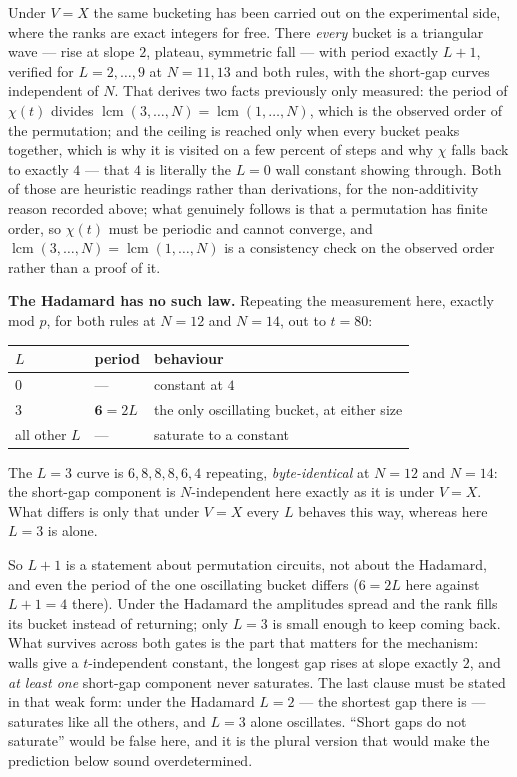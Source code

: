 \documentclass[11pt]{article}
\theoremstyle{plain}
\theoremstyle{remark}
\begin{document}
Under $V=X$ the same bucketing has been carried out on the experimental side,
where the ranks are exact integers for free. There \emph{every} bucket is a
triangular wave --- rise at slope $2$, plateau, symmetric fall --- with period
exactly $L+1$, verified for $L=2,\dots,9$ at $N=11,13$ and both rules, with the
short-gap curves independent of $N$. That derives two facts previously only
measured: the period of $\chi(t)$ divides
$\operatorname{lcm}(3,\dots,N)=\operatorname{lcm}(1,\dots,N)$, which is the
observed order of the permutation; and the ceiling is reached only when every
bucket peaks together, which is why it is visited on a few percent of steps and
why $\chi$ falls back to exactly $4$ --- that $4$ is literally the $L=0$ wall
constant showing through. Both of those are heuristic readings rather than
derivations, for the non-additivity reason recorded above; what genuinely follows
is that a permutation has finite order, so $\chi(t)$ must be periodic and cannot
converge, and $\operatorname{lcm}(3,\dots,N)=\operatorname{lcm}(1,\dots,N)$ is a
consistency check on the observed order rather than a proof of it.

\textbf{The Hadamard has no such law.} Repeating the measurement here, exactly
mod $p$, for both rules at $N=12$ and $N=14$, out to $t=80$:

\begin{center}
\begin{tabular}{lll}
\toprule
$L$ & period & behaviour \\
\midrule
$0$ & --- & constant at $4$ \\
$3$ & $\mathbf{6} = 2L$ & the only oscillating bucket, at either size \\
all other $L$ & --- & saturate to a constant \\
\bottomrule
\end{tabular}
\end{center}

\noindent The $L=3$ curve is $6,8,8,8,6,4$ repeating, \emph{byte-identical} at
$N=12$ and $N=14$: the short-gap component is $N$-independent here exactly as it
is under $V=X$. What differs is only that under $V=X$ every $L$ behaves this way,
whereas here $L=3$ is alone.

\noindent So $L+1$ is a statement about permutation circuits, not about the
Hadamard, and even the period of the one oscillating bucket differs ($6=2L$ here
against $L+1=4$ there). Under the Hadamard the amplitudes spread and the rank
fills its bucket instead of returning; only $L=3$ is small enough to keep coming
back. What survives across both gates is the part that matters for the
mechanism: walls give a $t$-independent constant, the longest gap rises at slope
exactly $2$, and \emph{at least one} short-gap component never saturates. The
last clause must be stated in that weak form: under the Hadamard $L=2$ --- the
shortest gap there is --- saturates like all the others, and $L=3$ alone
oscillates. ``Short gaps do not saturate'' would be false here, and it is the
plural version that would make the prediction below sound overdetermined.
\end{document}
